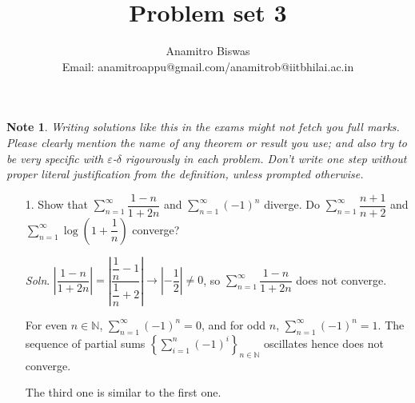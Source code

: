 \documentclass[a4paper,11pt]{article}
\newcommand{\lb}{\left(}
\newcommand{\rb}{\right)}
\newcommand{\lc}{\left\lbrace}
\newcommand{\rc}{\right\rbrace}
\renewcommand{\la}{\left|}
\renewcommand{\ra}{\right|}
\newcommand{\e}{\varepsilon}
\newcommand{\dt}{\delta}
\newcommand{\naturals}{\mathbb{N}}
\newcommand{\tends}{\rightarrow}
\newcommand{\dsum}{\displaystyle\sum}
\newtheorem{note}[thm]{Note}
\begin{document}
\title{Problem set 3}
\author{Anamitro Biswas\\Email: anamitroappu@gmail.com/anamitrob@iitbhilai.ac.in}
\maketitle
\begin{note}
Writing solutions like this in the exams might not fetch you full marks. Please clearly mention the name of any theorem or result you use; and also try to be very specific with $\e$-$\dt$ rigourously in each problem. Don't write one step without proper literal justification from the definition, unless prompted otherwise.
\end{note}
\begin{itemize}
  \item[1.]Show that $\dsum_{n=1}^\infty \dfrac{1-n}{1+2n}$ and $\dsum_{n=1}^\infty \lb -1\rb^n$ diverge. Do $\dsum_{n=1}^\infty \dfrac{n+1}{n+2}$ and $\dsum_{n=1}^\infty\log\lb 1+ \dfrac{1}{n}\rb$ converge?
  \item[\textit{Soln}.]$\la\dfrac{1-n}{1+2n}\ra=\la\dfrac{\dfrac{1}{n}-1}{\dfrac{1}{n}+2}\ra\tends\la-\dfrac{1}{2}\ra\neq 0$, so $\dsum_{n=1}^\infty \dfrac{1-n}{1+2n}$ does not converge.
  
  For even $n\in\naturals$, $\dsum_{n=1}^\infty \lb -1\rb^n=0$, and for odd $n$, $\dsum_{n=1}^\infty \lb -1\rb^n=1$. The sequence of partial sums $\lc\dsum_{i=1}^n \lb -1\rb^i\rc_{n\in\naturals}$ oscillates hence does not converge.
  
  The third one is similar to the first one.
  

\end{itemize}
\end{document}
